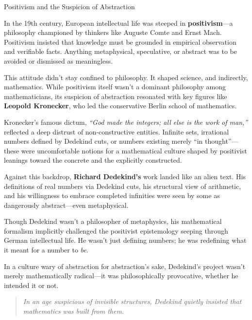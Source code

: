 \begin{HistoricalSidebar}{Positivism and the Suspicion of Abstraction}

    In the 19th century, European intellectual life was steeped in \textbf{positivism}---a philosophy championed by thinkers like Auguste Comte and Ernst Mach. Positivism insisted that knowledge must be grounded in empirical observation and verifiable facts. Anything metaphysical, speculative, or abstract was to be avoided or dismissed as meaningless.

    \medskip
    
    This attitude didn’t stay confined to philosophy. It shaped science, and indirectly, mathematics. While positivism itself wasn’t a dominant philosophy among mathematicians, its suspicion of abstraction resonated with key figures like \textbf{Leopold Kronecker}, who led the conservative Berlin school of mathematics.
    
    \medskip
    
    Kronecker’s famous dictum, \emph{“God made the integers; all else is the work of man,”} reflected a deep distrust of non-constructive entities. Infinite sets, irrational numbers defined by Dedekind cuts, or numbers existing merely “in thought”---these were uncomfortable notions for a mathematical culture shaped by positivist leanings toward the concrete and the explicitly constructed.

    \medskip
    
    Against this backdrop, \textbf{Richard Dedekind’s} work landed like an alien text. His definitions of real numbers via Dedekind cuts, his structural view of arithmetic, and his willingness to embrace completed infinities were seen by some as dangerously abstract---even metaphysical.

    \medskip
    
    Though Dedekind wasn’t a philosopher of metaphysics, his mathematical formalism implicitly challenged the positivist epistemology seeping through German intellectual life. He wasn’t just defining numbers; he was redefining what it meant for a number to \emph{be}.

    \medskip
    
    In a culture wary of abstraction for abstraction’s sake, Dedekind’s project wasn’t merely mathematically radical---it was philosophically provocative, whether he intended it or not.
    
    \begin{quote}
    \textit{In an age suspicious of invisible structures, Dedekind quietly insisted that mathematics was built from them.}
    \end{quote}
    
\end{HistoricalSidebar}
